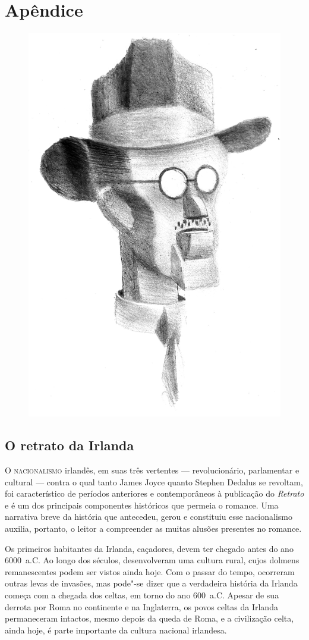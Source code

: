 
\part{Apêndice}

\pagestyle{estilo}

\begin{figure}[c]
\begin{center}
\includegraphics[width=.6\textwidth]{joyce3.jpg}
\end{center}
\end{figure}


\chapter{O retrato da Irlanda}


\noindent\textsc{O nacionalismo} irlandês, em suas três vertentes ---  revolucionário,
parlamentar e cultural --- contra o qual tanto James Joyce quanto Stephen
Dedalus se revoltam, foi característico de períodos anteriores e
contemporâneos à publicação do \textit{Retrato} e é um dos principais
componentes históricos que permeia o romance. Uma narrativa breve da
história que antecedeu, gerou e constituiu esse nacionalismo auxilia,
portanto, o leitor a compreender as muitas alusões presentes no
romance. 

Os primeiros habitantes da Irlanda, caçadores, devem ter chegado antes
do ano 6000~a.C. Ao longo dos séculos, desenvolveram uma cultura rural,
cujos dolmens remanescentes podem ser vistos ainda hoje. Com o passar
do tempo, ocorreram outras levas de invasões, mas pode"-se dizer que a
verdadeira história da Irlanda começa com a chegada dos celtas, em
torno do ano 600~a.C. Apesar de sua derrota por Roma no continente e na
Inglaterra, os povos celtas da Irlanda permaneceram intactos, mesmo
depois da queda de Roma, e a civilização celta, ainda hoje, é parte
importante da cultura nacional irlandesa.

